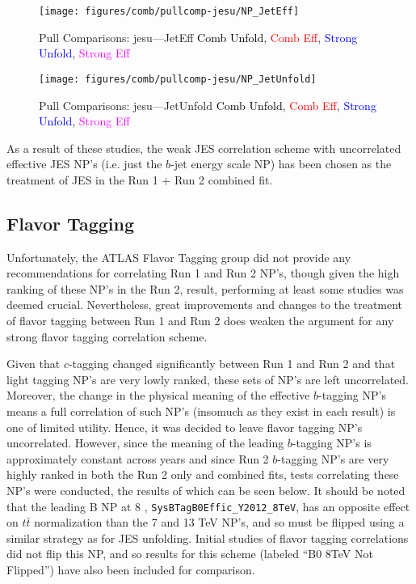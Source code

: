 \begin{figure}[!htbp]\captionsetup{justification=centering}
\centering
\texttt{[image: figures/comb/pullcomp-jesu/NP\_JetEff]}
  \caption{Pull Comparisons: jesu---JetEff  \textcolor{black}{Comb Unfold}, \textcolor{red}{Comb Eff}, \textcolor{blue}{Strong Unfold}, \textcolor{magenta}{Strong Eff}}
  \label{fig:PullComparisons:jesu---JetEff}
\end{figure}

\begin{figure}[!htbp]\captionsetup{justification=centering}
\centering
\texttt{[image: figures/comb/pullcomp-jesu/NP\_JetUnfold]}
  \caption{Pull Comparisons: jesu---JetUnfold  \textcolor{black}{Comb Unfold}, \textcolor{red}{Comb Eff}, \textcolor{blue}{Strong Unfold}, \textcolor{magenta}{Strong Eff}}
  \label{fig:PullComparisons:jesu---JetUnfold}
\end{figure}

As a result of these studies, the weak JES correlation scheme with uncorrelated effective JES NP's (i.e. just the $b$-jet energy scale NP) has been chosen as the treatment of JES in the Run 1 + Run 2 combined fit.

\clearpage
\subsection{Flavor Tagging}
\label{sec:ft}
Unfortunately, the ATLAS Flavor Tagging group did not provide any recommendations for correlating Run 1 and Run 2 NP's, though given the high ranking of these NP's in the Run 2, result, performing at least some studies was deemed crucial.  Nevertheless, great improvements and changes to the treatment of flavor tagging between Run 1 and Run 2 does weaken the argument for any strong flavor tagging correlation scheme.

Given that $c$-tagging changed significantly between Run 1 and Run 2 and that light tagging NP's are very lowly ranked, these sets of NP's are left uncorrelated.  Moreover, the change in the physical meaning of the effective $b$-tagging NP's means a full correlation of such NP's (insomuch as they exist in each result) is one of limited utility.  Hence, it was decided to leave flavor tagging NP's uncorrelated.  However, since the meaning of the leading $b$-tagging NP's is approximately constant across years and since Run 2 $b$-tagging NP's are very highly ranked in both the Run 2 only and combined fits, tests correlating these NP's were conducted, the results of which can be seen below.  It should be noted that the leading B NP at 8 \TeV, \texttt{SysBTagB0Effic\_Y2012\_8TeV}, has an opposite effect on $t\bar{t}$ normalization than the 7 and 13 TeV NP's, and so must be flipped using a similar strategy as for JES unfolding.  Initial studies of flavor tagging correlations did not flip this NP, and so results for this scheme (labeled ``B0 8TeV Not Flipped'') have also been included for comparison.

